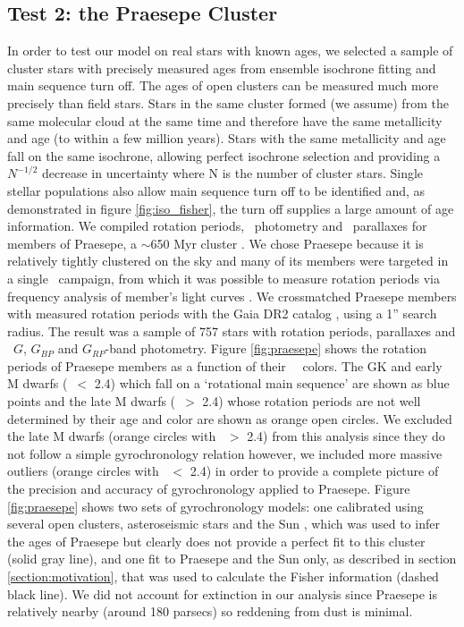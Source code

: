 \subsection{Test 2: the Praesepe Cluster}
In order to test our model on real stars with known ages, we selected a sample
of cluster stars with precisely measured ages from ensemble isochrone fitting
and main sequence turn off.
The ages of open clusters can be measured much more precisely than field
stars.
Stars in the same cluster formed (we assume) from the same molecular cloud at
the same time and therefore have the same metallicity and age (to within a few
million years).
Stars with the same metallicity and age fall on the same isochrone,
allowing perfect isochrone selection and providing a $N^{-1/2}$ decrease in
uncertainty where N is the number of cluster stars.
Single stellar populations also allow main sequence turn off to be identified
and, as demonstrated in figure \ref{fig:iso_fisher}, the turn off supplies a
large amount of age information.
We compiled rotation periods, \Gaia\ photometry and \gaia\ parallaxes for
members of Praesepe, a $\sim$650 Myr cluster \citep{fossati2008}.
We chose Praesepe because it is relatively tightly clustered on the sky and
many of its members were targeted in a single \ktwo\ campaign, from which it
was possible to measure rotation periods via frequency analysis of member's
light curves \citep{douglas2017}.
We crossmatched Praesepe members with measured rotation periods
\citep{douglas2017} with the Gaia DR2 catalog \citep{brown2018}, using a 1''
search radius.
The result was a sample of 757 stars with rotation periods, parallaxes and
\gaia\ $G$, $G_{BP}$ and $G_{RP}$-band photometry.
Figure \ref{fig:praesepe} shows the rotation periods of Praesepe members as
a function of their \gaia\ \gcolor\ colors.
The GK and early M dwarfs (\gcolor\ $<$ 2.4) which fall on a `rotational main
sequence' are shown as blue points and the late M dwarfs (\gcolor\ $>$ 2.4)
whose rotation periods are not well determined by their age and color are
shown as orange open circles.
We excluded the late M dwarfs (orange circles with \gcolor\ $>$ 2.4) from this
analysis since they do not follow a simple gyrochronology relation however, we
included more massive outliers (orange circles with \gcolor\ $<$ 2.4) in order
to provide a complete picture of the precision and accuracy of gyrochronology
applied to Praesepe.
Figure \ref{fig:praesepe} shows two sets of gyrochronology models: one
calibrated using several open clusters, asteroseismic stars and the Sun
\citep{angus2015}, which was used to infer the ages of Praesepe but clearly
does not provide a perfect fit to this cluster (solid gray line), and one fit
to Praesepe and the Sun only, as described in section
\ref{section:motivation}, that was used to calculate the Fisher information
(dashed black line).
We did not account for extinction in our analysis since Praesepe is relatively
nearby (around 180 parsecs) so reddening from dust is minimal.

